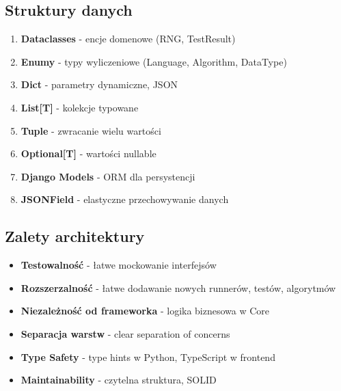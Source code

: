 \documentclass[12pt,a4paper]{article}
\begin{document}
\subsection{Struktury danych}

\begin{enumerate}
    \item \textbf{Dataclasses} - encje domenowe (RNG, TestResult)
    \item \textbf{Enumy} - typy wyliczeniowe (Language, Algorithm, DataType)
    \item \textbf{Dict} - parametry dynamiczne, JSON
    \item \textbf{List[T]} - kolekcje typowane
    \item \textbf{Tuple} - zwracanie wielu wartości
    \item \textbf{Optional[T]} - wartości nullable
    \item \textbf{Django Models} - ORM dla persystencji
    \item \textbf{JSONField} - elastyczne przechowywanie danych
\end{enumerate}

\subsection{Zalety architektury}

\begin{itemize}
    \item \textbf{Testowalność} - łatwe mockowanie interfejsów
    \item \textbf{Rozszerzalność} - łatwe dodawanie nowych runnerów, testów, algorytmów
    \item \textbf{Niezależność od frameworka} - logika biznesowa w Core
    \item \textbf{Separacja warstw} - clear separation of concerns
    \item \textbf{Type Safety} - type hints w Python, TypeScript w frontend
    \item \textbf{Maintainability} - czytelna struktura, SOLID
\end{itemize}
\end{document}

